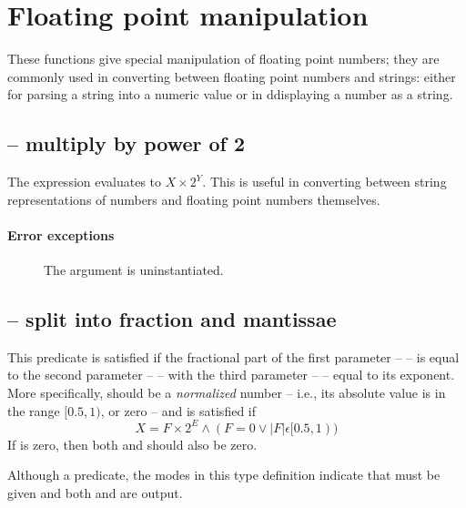 \section{Floating point manipulation}
\label{arith:manip}

These functions give special manipulation of floating point numbers; they are commonly used in converting between floating point numbers and strings: either for parsing a string into a numeric value or in ddisplaying a number as a string.

\subsection{ -- multiply by power of 2}
\label{arith:ldexp}


The expression  evaluates to $X\times2^{Y}$. This is useful in converting between string representations of numbers and floating point numbers themselves.

\paragraph{Error exceptions}
\begin{description}
\item[]
The argument is uninstantiated.
\end{description}

\subsection{ -- split into fraction and mantissae}
\label{arith:frexp}


This predicate is satisfied if the fractional part of the first parameter --  -- is equal to the second parameter --  -- with the third parameter --  -- equal to its exponent. More specifically,  should be a \emph{normalized} number -- i.e., its absolute value is in the range $[0.5,1)$, or zero -- and  is satisfied if
\[
X=F\times2^{E} \wedge ( F=0 \vee |F| \epsilon [0.5,1) )
\]
If  is zero, then both  and  should also be zero.

Although a predicate, the modes in this type definition indicate that  must be given and both  and  are output.

